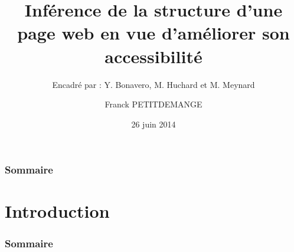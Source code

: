 \documentclass[]{beamer}
\begin{document}
\title[Inférence de la structure d'une page web]{Inférence de la structure d'une page web en vue d'améliorer son accessibilité}
\subtitle[\ldots]{Encadré par : Y. Bonavero, M. Huchard et M. Meynard}
\author[Franck PETITDEMANGE]{Franck PETITDEMANGE}
\date{26 juin 2014}




\begin{frame}
\titlepage
\end{frame}

\begin{frame}
  \frametitle{Sommaire}
  \tableofcontents[hideothersubsections]
\end{frame}

\section{Introduction} 
\begin{frame}
  \frametitle{Sommaire}
\end{frame}
\end{document}
